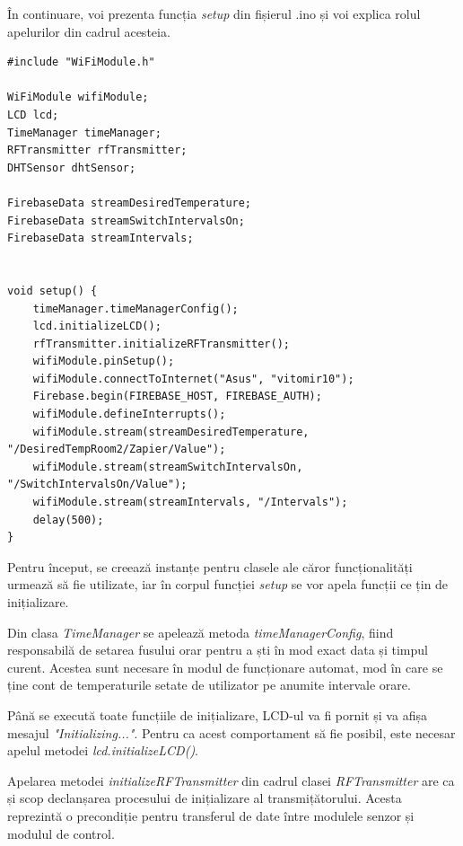 \vspace{1em}

	În continuare, voi prezenta funcția \textit{setup} din fișierul .ino și voi explica rolul apelurilor din cadrul acesteia.

\vspace{2em}

\begin{lstlisting}
#include "WiFiModule.h"

WiFiModule wifiModule;
LCD lcd;
TimeManager timeManager;
RFTransmitter rfTransmitter;
DHTSensor dhtSensor;

FirebaseData streamDesiredTemperature;
FirebaseData streamSwitchIntervalsOn;
FirebaseData streamIntervals;


void setup() {
    timeManager.timeManagerConfig();
    lcd.initializeLCD();
    rfTransmitter.initializeRFTransmitter();
    wifiModule.pinSetup();
    wifiModule.connectToInternet("Asus", "vitomir10");
    Firebase.begin(FIREBASE_HOST, FIREBASE_AUTH);
    wifiModule.defineInterrupts();
    wifiModule.stream(streamDesiredTemperature, "/DesiredTempRoom2/Zapier/Value");
    wifiModule.stream(streamSwitchIntervalsOn, "/SwitchIntervalsOn/Value");  
    wifiModule.stream(streamIntervals, "/Intervals");
    delay(500);
}
\end{lstlisting}

\vspace{2em}

	Pentru început, se creează instanțe pentru clasele ale căror funcționalități urmează să fie utilizate, iar în corpul funcției \textit{setup} se vor apela funcții ce țin de inițializare.

	Din clasa \textit{TimeManager} se apelează metoda \textit{timeManagerConfig}, fiind responsabilă de setarea fusului orar pentru a ști în mod exact data și timpul curent. Acestea sunt necesare în modul de funcționare automat, mod în care se ține cont de temperaturile setate de utilizator pe anumite intervale orare. 

	Până se execută toate funcțiile de inițializare, LCD-ul va fi pornit și va afișa mesajul \textit{"Initializing..."}. Pentru ca acest comportament să fie posibil, este necesar apelul metodei \textit{lcd.initializeLCD()}. 	

	Apelarea metodei \textit{initializeRFTransmitter} din cadrul clasei \textit{RFTransmitter} are ca și scop declanșarea procesului de inițializare al transmițătorului. Acesta reprezintă o precondiție pentru transferul de date între modulele senzor și modulul de control.

